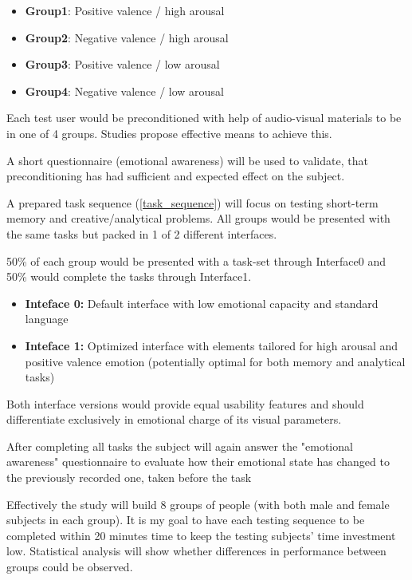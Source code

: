\begin{itemize}
	\item \textbf{Group1}: Positive valence / high arousal
	\item \textbf{Group2}: Negative valence / high arousal
	\item \textbf{Group3}: Positive valence / low arousal
	\item \textbf{Group4}: Negative valence / low arousal
\end{itemize}

Each test user would be preconditioned with help of audio-visual materials to be in one of 4 groups. 
Studies \citationneeded propose effective means to achieve this.

A short questionnaire (emotional awareness) will be used to validate, that preconditioning has had sufficient and expected effect on the subject.

A prepared task sequence (\ref{task_sequence}) will focus on testing short-term memory and creative/analytical problems. 
All groups would be presented with the same tasks but packed in 1 of 2 different interfaces.

50\% of each group would be presented with a task-set through Interface0 and 50\% would complete the tasks through Interface1.

\begin{itemize}
	\item \textbf{Inteface 0:} Default interface with low emotional capacity and standard language
	\item \textbf{Inteface 1:} Optimized interface with elements tailored for high arousal and positive valence emotion (potentially optimal for both memory and analytical tasks)
\end{itemize}

Both interface versions would provide equal usability features and should differentiate exclusively in emotional charge of its visual parameters.

After completing all tasks the subject will again answer the "emotional awareness" questionnaire to evaluate how their emotional state has changed to the previously recorded one, taken before the task

Effectively the study will build 8 groups of people (with both male and female subjects in each group).
It is my goal to have each testing sequence to be completed within 20 minutes time to keep the testing subjects' time investment low.
Statistical analysis will show whether differences in performance between groups could be observed. 


